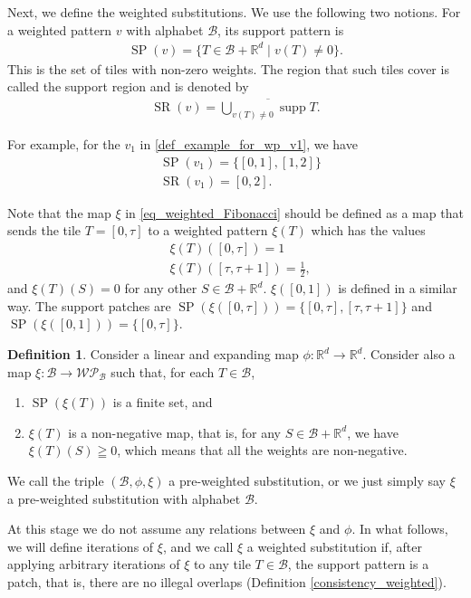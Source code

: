 \documentclass[a4]{amsart}
\DeclareMathOperator{\supp}{supp}
\DeclareMathOperator{\SP}{SP}
\DeclareMathOperator{\SR}{SR}
\newcommand{\WP}{\mathcal{W}\mathcal{P}}
\theoremstyle{definition}
\newtheorem{defin}{Definition}%
\begin{document}
Next, we define the weighted substitutions. We use the following two notions.
For a weighted pattern $v$ with alphabet $\mathcal{B}$, its support
pattern is
\begin{align*}
 \SP(v)=\{T\in\mathcal{B}+\mathbb{R}^d\mid v(T)\neq 0\}.
\end{align*}
This is the set of tiles with non-zero
weights.
The region that such tiles cover is called the support region and is denoted by
\begin{align*}
\SR(v)=\overline{\bigcup_{v(T)\neq 0}\supp T}. 
\end{align*}
{\color{blue}For example, for the $v_1$
in \eqref{def_example_for_wp_v1}, we have
\begin{align*}
    &\SP(v_1)=\{[0,1],[1,2]\}\\
    &\SR(v_1)=[0,2].
\end{align*}


Note that
the map $\xi$ in \eqref{eq_weighted_Fibonacci} should be defined as a map that sends the tile $T=[0,\tau]$ to a weighted pattern  $\xi(T)$ 
which has the values
\begin{align*}
    &\xi(T)([0,\tau])=1\\
    &\xi(T)([\tau,\tau+1])=\frac{1}{2},
\end{align*}
and $\xi(T)(S)=0$ for any other $S\in\mathcal{B}+\mathbb{R}^d$. $\xi([0,1])$ is defined in a similar way.
The support patches are 
$\SP(\xi([0,\tau]))=\{[0,\tau],[\tau,\tau+1]\}$ and $\SP(\xi([0,1]))=\{[0,\tau]\}$.}

\begin{defin}
Consider a linear and expanding map
$\phi\colon\mathbb{R}^d\rightarrow\mathbb{R}^d$.
Consider also a map $\xi\colon\mathcal{B}\rightarrow\WP_{\mathcal{B}}$ such that, for each $T\in\mathcal{B}$,
\begin{enumerate}
 \item $\SP(\xi(T))$ is a finite set, and
\item $\xi(T)$ is a non-negative map, that is, for any $S\in\mathcal{B}+\mathbb{R}^d$, we have
$\xi(T)(S)\geqq 0$, which means that all the weights are non-negative.
\end{enumerate}
We call the triple
$(\mathcal{B},\phi,\xi)$ a pre-weighted substitution,
or we just simply say $\xi$ a pre-weighted substitution with alphabet $\mathcal{B}$. 
\end{defin}


At this stage we do not assume any relations between $\xi$ and $\phi$.
In what follows, we will define iterations of $\xi$, and we call $\xi$ a weighted substitution if, after applying arbitrary iterations of $\xi$ to any tile $T\in\mathcal{B}$, the support pattern is a patch, that is, there are
no illegal overlaps (Definition \ref{consistency_weighted}).
\end{document}
